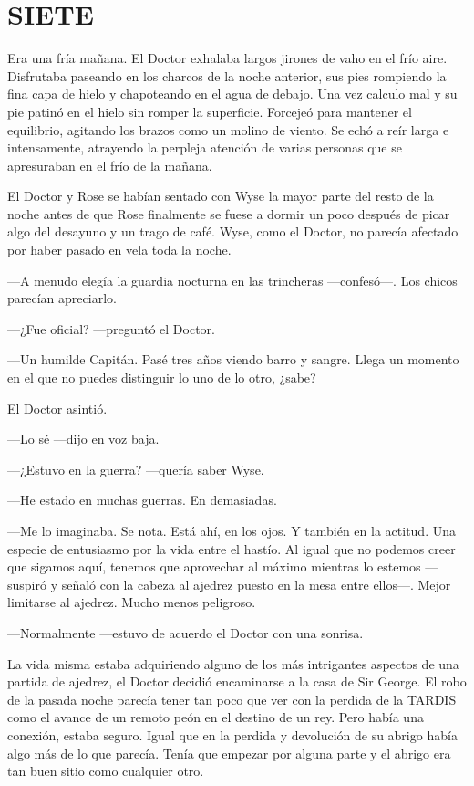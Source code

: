 \chapter*{SIETE}

{Era una fría mañana. El Doctor exhalaba largos jirones de vaho en el
	frío aire. Disfrutaba paseando en los charcos de la noche anterior, sus
	pies rompiendo la fina capa de hielo y chapoteando en el agua de debajo.
	Una vez calculo mal y su pie patinó en el hielo sin romper la
	superficie. Forcejeó para mantener el equilibrio, agitando los brazos
	como un molino de viento. Se echó a reír larga e intensamente, atrayendo
	la perpleja atención de varias personas que se apresuraban en el frío de
la mañana.}

{El Doctor y Rose se habían sentado con Wyse la mayor parte del resto de
	la noche antes de que Rose finalmente se fuese a dormir un poco después
	de picar algo del desayuno y un trago de café. Wyse, como el Doctor, no
parecía afectado por haber pasado en vela toda la noche.}

{---A menudo elegía la guardia nocturna en las trincheras ---confesó---.
Los chicos parecían apreciarlo.}

{---¿Fue oficial? ---preguntó el Doctor.}

{---Un humilde Capitán. Pasé tres años viendo barro y sangre. Llega un
momento en el que no puedes distinguir lo uno de lo otro, ¿sabe?}

{El Doctor asintió.}

{---Lo sé ---dijo en voz baja.}

{---¿Estuvo en la guerra? ---quería saber Wyse.}

{---He estado en muchas guerras. En demasiadas.}

{---Me lo imaginaba. Se nota. Está ahí, en los ojos. Y también en la
	actitud. Una especie de entusiasmo por la vida entre el hastío. Al igual
	que no podemos creer que sigamos aquí, tenemos que aprovechar al máximo
	mientras lo estemos ---suspiró y señaló con la cabeza al ajedrez puesto
	en la mesa entre ellos---. Mejor limitarse al ajedrez. Mucho menos
peligroso.}

{---Normalmente ---estuvo de acuerdo el Doctor con una sonrisa.}

{La vida misma estaba adquiriendo alguno de los más intrigantes aspectos
	de una partida de ajedrez, el Doctor decidió encaminarse a la casa de
	Sir George. El robo de la pasada noche parecía tener tan poco que ver
	con la perdida de la TARDIS como el avance de un remoto peón en el
	destino de un rey. Pero había una conexión, estaba seguro. Igual que en
	la perdida y devolución de su abrigo había algo más de lo que parecía.
	Tenía que empezar por alguna parte y el abrigo era tan buen sitio como
cualquier otro.}

